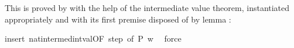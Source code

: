 \begin{isabellebody}
\begin{isamarkuptxt}
This is proved by  with the help of the intermediate value theorem,
instantiated appropriately and with its first premise disposed of by lemma
:%
\end{isamarkuptxt}%
\isamarkuptrue%
\isamarkupfalse%
{}insert\ nat{}{}intermed{}int{}val{}OF\ step{}{}\ of\ {}P{}\ {}w{}\ {}{}{}{}{}\isanewline
{}\isamarkupfalse%
\ force%
\endisatagproof
{\isafoldproof}%
%
\isadelimproof
%
\endisadelimproof
%
\begin{isamarkuptext}%
\noindent


\end{isamarkuptext}
\end{isabellebody}
